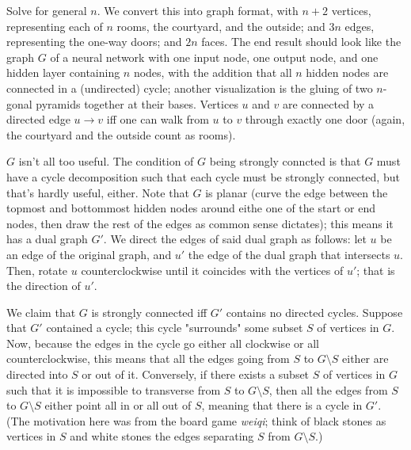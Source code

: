 \begin{solution}\hfil\medskip
  
    Solve for general $n$. 
    We convert this into graph format, with $n + 2$ vertices, representing each of $n$ rooms, 
    the courtyard, and the outside; and $3n$ edges, representing the one-way doors; and $2n$ 
    faces. The end result should look like the graph $G$ of a neural network with one input node, 
    one output node, and one hidden layer containing $n$ nodes, with the addition that 
    all $n$ hidden nodes are connected in a (undirected) cycle; another visualization is 
    the gluing of two $n$-gonal pyramids together at their bases. Vertices $u$ and $v$ 
    are connected by a directed edge $u \to v$ iff one can walk from $u$ to $v$ through exactly 
    one door (again, the courtyard and the outside count as rooms). \medskip

    $G$ isn't all too useful. The condition of $G$ being strongly conncted is 
    that $G$ must have a cycle decomposition such that each cycle must be strongly connected, 
    but that's hardly useful, either. Note that $G$ is planar (curve the edge between the topmost 
    and bottommost hidden nodes around eithe one of the start or end nodes, then draw the rest of 
    the edges as common sense dictates); this means it has a dual graph $G'$. We direct the edges of 
    said dual graph as follows: let $u$ be an edge of the original graph, and $u'$ the edge of 
    the dual graph that intersects $u$. Then, rotate $u$ counterclockwise until it coincides with the 
    vertices of $u'$; that is the direction of $u'$. \medskip

    We claim that $G$ is strongly connected iff $G'$ contains no directed cycles. Suppose that 
    $G'$ contained a cycle; this cycle "surrounds" some subset $S$ of vertices in $G$. Now, 
    because the edges in the cycle go either all clockwise or all counterclockwise, 
    this means that all the edges going from $S$ to $G \setminus S$ either are directed 
    into $S$ or out of it. Conversely, if there exists a subset $S$ of vertices in $G$ such that 
    it is impossible to transverse from $S$ to $G \setminus S$, then all the edges from 
    $S$ to $G \setminus S$ either point all in or all out of $S$, meaning that there is a cycle 
    in $G'$. (The motivation here was from the board game \textit{weiqi}; think of black stones 
    as vertices in $S$ and white stones the edges separating $S$ from $G \setminus S$.) \medskip


\end{solution}
